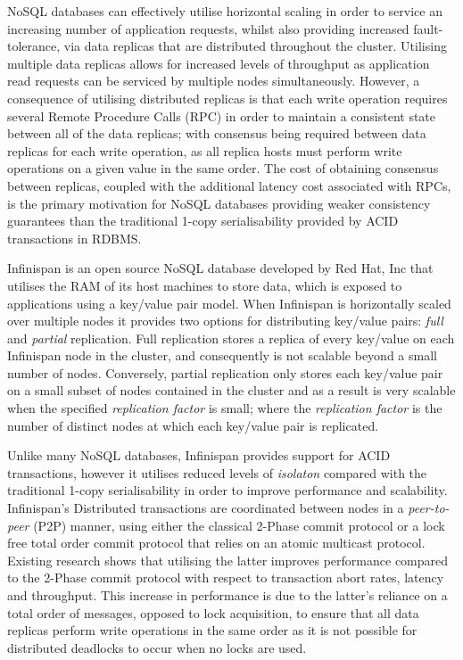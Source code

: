     NoSQL databases can effectively utilise horizontal scaling in order to service an increasing number of application requests, whilst also providing increased fault-tolerance, via data replicas that are distributed throughout the cluster.  Utilising multiple data replicas allows for increased levels of throughput as application read requests can be serviced by multiple nodes simultaneously.  However, a consequence of utilising distributed replicas is that each write operation requires several Remote Procedure Calls (RPC) in order to maintain a consistent state between all of the data replicas; with consensus being required between data replicas for each write operation, as all replica hosts must perform write operations  on a given value in the same order.  The cost of obtaining consensus between replicas, coupled with the additional latency cost associated with RPCs, is the primary motivation for NoSQL databases providing weaker consistency guarantees than the traditional 1-copy serialisability provided by ACID transactions in RDBMS.  
    
    Infinispan \citep{Infinispan} is an open source NoSQL database developed by Red Hat, Inc \citep{RedHat} that utilises the RAM of its host machines to store data, which is exposed to applications using a key/value pair model.  When Infinispan is horizontally scaled over multiple nodes it provides two options for distributing key/value pairs: \emph{full} and \emph{partial} replication.  Full replication stores a replica of every key/value on each Infinispan node in the cluster, and consequently is not scalable beyond a small number of nodes.  Conversely, partial replication only stores each key/value pair on a small subset of nodes contained in the cluster and as a result is very scalable when the specified \emph{replication factor} is small; where the \emph{replication factor} is the number of distinct nodes at which each key/value pair is replicated.  
    
    Unlike many NoSQL databases, Infinispan provides support for ACID transactions, however it utilises reduced levels of \emph{isolaton} compared with the traditional 1-copy serialisability in order to improve performance and scalability.  Infinispan's Distributed transactions are coordinated between nodes in a \emph{peer-to-peer} (P2P) manner, using either the classical 2-Phase commit protocol or a lock free total order commit protocol that relies on an atomic multicast protocol.  Existing research \citep{Ruivo:2011:ETO:2120967.2121604} shows that utilising the latter improves performance compared to the 2-Phase commit protocol with respect to transaction abort rates, latency and throughput.  This increase in performance is due to the latter's reliance on a total order of messages, opposed to lock acquisition, to ensure that all data replicas perform write operations in the same order as it is not possible for distributed deadlocks to occur when no locks are used.  
    
